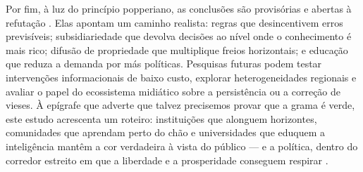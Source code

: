 Por fim, à luz do princípio popperiano, as conclusões são provisórias e abertas à refutação \cite{popperlogic}. Elas apontam um caminho realista: regras que desincentivem erros previsíveis; subsidiariedade que devolva decisões ao nível onde o conhecimento é mais rico; difusão de propriedade que multiplique freios horizontais; e educação que reduza a demanda por más políticas. Pesquisas futuras podem testar intervenções informacionais de baixo custo, explorar heterogeneidades regionais e avaliar o papel do ecossistema midiático sobre a persistência ou a correção de vieses. À epígrafe que adverte que talvez precisemos provar que a grama é verde, este estudo acrescenta um roteiro: instituições que alonguem horizontes, comunidades que aprendam perto do chão e universidades que eduquem a inteligência mantêm a cor verdadeira à vista do público — e a política, dentro do corredor estreito em que a liberdade e a prosperidade conseguem respirar \cite{acemoglu2019narrow,Acemoglu2019}.
